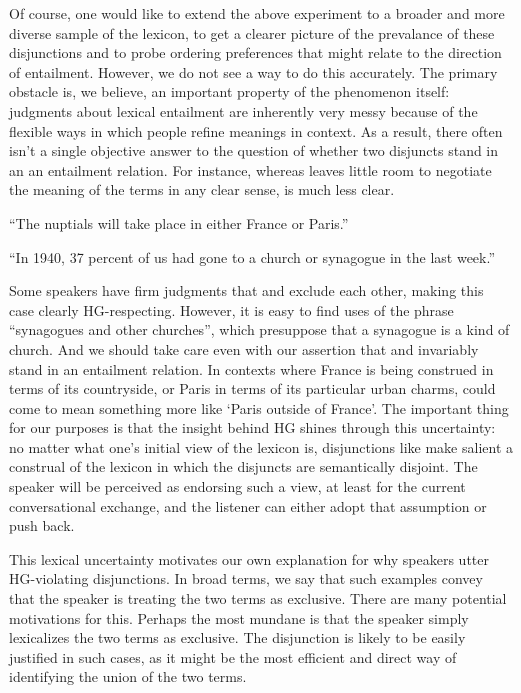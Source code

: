 \documentclass{article}
\begin{document}
Of course, one would like to extend the above experiment to a broader
and more diverse sample of the lexicon, to get a clearer picture of
the prevalance of these disjunctions and to probe ordering preferences
that might relate to the direction of entailment. However, we do not
see a way to do this accurately. The primary obstacle is, we believe,
an important property of the phenomenon itself: judgments about
lexical entailment are inherently very messy because of the flexible
ways in which people refine meanings in context. As a result, there
often isn't a single objective answer to the question of whether two
disjuncts stand in an an entailment relation. For instance, whereas
 leaves little room to negotiate the
meaning of the terms in any clear sense,
 is much less clear.
%
\begin{examples}
\item\label{exclusive}
  \begin{examples}
  \item\label{franceorparis} ``The nuptials will take place in either
    France or Paris.''
  \item\label{churchorsynagogue} ``In 1940, 37 percent of us had gone
    to a church or synagogue in the last week.''
  \end{examples}
\end{examples}
%
Some speakers have firm judgments that  and
 exclude each other, making this case clearly
HG-respecting. However, it is easy to find uses of the phrase
``synagogues and other churches'', which presuppose that a synagogue
is a kind of church. And we should take care even with our assertion
that  and  invariably stand in an entailment
relation. In contexts where France is being construed in terms of its
countryside, or Paris in terms of its particular urban charms,
 could come to mean something more like `Paris outside of
France'. The important thing for our purposes is that the insight
behind HG shines through this uncertainty: no matter what one's
initial view of the lexicon is, disjunctions like  make
salient a construal of the lexicon in which the disjuncts are
semantically disjoint. The speaker will be perceived as endorsing such
a view, at least for the current conversational exchange, and the
listener can either adopt that assumption or push back.

This lexical uncertainty motivates our own explanation for why
speakers utter HG-violating disjunctions. In broad terms, we say that
such examples convey that the speaker is treating the two terms as
exclusive. There are many potential motivations for this. Perhaps the
most mundane is that the speaker simply lexicalizes the two terms as
exclusive. The disjunction is likely to be easily justified in such
cases, as it might be the most efficient and direct way of identifying
the union of the two terms.
\end{document}

